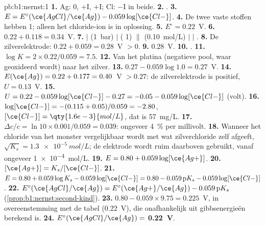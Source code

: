 \begin{solution}{pb:b1:nernst:1}
\textbf{1.} Ag: 0, $+$I, $+$I; Cl: $-$I in beide.
\textbf{2.} .
\textbf{3.} $E = E^\circ(\ce{AgCl}/\ce{Ag}) - 0.059\log[\ce{Cl-}]$.
\textbf{4.} De twee vaste stoffen hebben  1; alleen het
chloride-ion is in oplossing.
\textbf{5.} $E^\circ = 0.22$~V.
\textbf{6.} $0.22 + 0.118 = 0.34$~V.
\textbf{7.}  $|$  (\qty{1}{bar}) $|$  ( 1)
$\|$  (\qty{0.10}{mol/L}) $|$  $|$ .
\textbf{8.} De zilverelektrode: $0.22 + 0.059 = 0.28$~V $> 0$.
\textbf{9.} $0.28$~V.
\textbf{10.} .
\textbf{11.} $\log K = 2 \times 0.22/0.059 = 7.5$.
\textbf{12.} Van het platina (negatieve pool, waar  geoxideerd
wordt) naar het zilver.
\textbf{13.} $0.27 - 0.059\log 1.0 = 0.27$~V.
\textbf{14.} $E(\ce{Ag}) = 0.22 + 0.177 = 0.40$~V $> 0.27$: de
zilverelektrode is positief, $U = 0.13$~V.
\textbf{15.} $U = 0.22 - 0.059\log[\ce{Cl-}] - 0.27 = -0.05 -
0.059\log[\ce{Cl-}]$ (volt).
\textbf{16.} $\log[\ce{Cl-}] = -(0.115 + 0.05)/0.059 = -2.80$,
$[\ce{Cl-}] = \qty{1.6e-3}{mol/L}$, dat is \qty{57}{mg/L}.
\textbf{17.} $\Delta c/c = \ln 10 \times 0.001/0.059 = 0.039$: ongeveer
\qty{4}{\percent} per millivolt.
\textbf{18.} Wanneer het chloride van het monster vergelijkbaar wordt met
wat zilverchloride zelf afgeeft, $\sqrt{K_s} = \qty{1.3e-5}{mol/L}$; de
elektrode wordt ruim daarboven gebruikt, vanaf ongeveer
\qty{1e-4}{mol/L}.
\textbf{19.} $E = 0.80 + 0.059\log[\ce{Ag+}]$.
\textbf{20.} $[\ce{Ag+}] = K_s/[\ce{Cl-}]$.
\textbf{21.} $E = 0.80 + 0.059\log K_s - 0.059\log[\ce{Cl-}] = 0.80 -
0.059\,\mathrm{p}K_s - 0.059\log[\ce{Cl-}]$.
\textbf{22.} $E^\circ(\ce{AgCl}/\ce{Ag}) = E^\circ(\ce{Ag+}/\ce{Ag}) -
0.059\,\mathrm{p}K_s$ (\cref{prop:b1:nernst:second-kind}).
\textbf{23.} $0.80 - 0.059 \times 9.75 = 0.225$~V, in overeenstemming met
de tabel (0.22~V), die onafhankelijk uit gibbsenergieën berekend is.
\textbf{24.} $E^\circ(\ce{AgCl}/\ce{Ag}) = $ \textbf{0.22~V}.
\end{solution}
